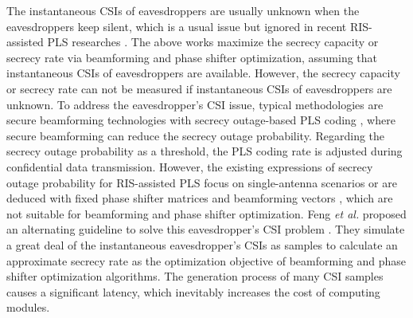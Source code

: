 \documentclass[journal]{IEEEtran}
\theoremstyle{definition}
\begin{document}
The instantaneous CSIs of eavesdroppers are usually unknown when the eavesdroppers keep silent, which is a usual issue but ignored in recent RIS-assisted PLS researches \cite{Niu2021,Qiao2020,Hong2019,Dong2020,Miao2019,Yu2020, Shu2021,Zheng2021, HongRobust2021, Elhoushy2021,HongAN2020}. The above works maximize the secrecy capacity or secrecy rate via beamforming and phase shifter optimization, assuming that instantaneous CSIs of eavesdroppers are available. However, the secrecy capacity or secrecy rate can not be measured if instantaneous CSIs of eavesdroppers are unknown. To address the eavesdropper's CSI issue, typical methodologies are secure beamforming technologies with secrecy outage-based PLS coding \cite{Harrison2013,LiuICV2021}, where secure beamforming can reduce the secrecy outage probability. Regarding the secrecy outage probability as a threshold, the PLS coding rate is adjusted during confidential data transmission. However, the existing expressions of secrecy outage probability for RIS-assisted PLS focus on single-antenna scenarios \cite{Yang2020, Trigui2021, hong2020outage} or are deduced with fixed phase shifter matrices and beamforming vectors \cite{Zhangtifs2021}, which are not suitable for beamforming and phase shifter optimization. Feng \textsl{et al.} proposed an alternating guideline to solve this eavesdropper's CSI problem \cite{Feng2020}. They simulate a great deal of the instantaneous eavesdropper's CSIs as samples to calculate an approximate secrecy rate as the optimization objective of beamforming and phase shifter optimization algorithms. The generation process of many CSI samples causes a significant latency, which inevitably increases the cost of computing modules.
\end{document}
